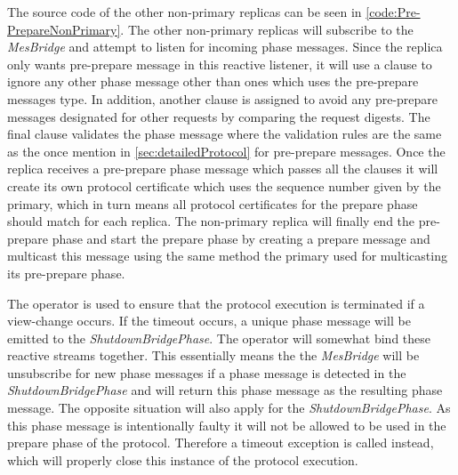 The source code of the other non-primary replicas can be seen in \autoref{code:Pre-PrepareNonPrimary}. The other non-primary replicas will subscribe to the  \emph{MesBridge} and attempt to listen for incoming phase messages. Since the replica only wants pre-prepare message in this reactive listener, it will use a  clause to ignore any other phase message other than ones which uses the pre-prepare messages type. In addition, another  clause is assigned to avoid any pre-prepare messages designated for other requests by comparing the request digests. The final  clause validates the phase message where the validation  rules are the same as the once mention in \autoref{sec:detailedProtocol} for pre-prepare messages. Once the replica receives a pre-prepare phase message which passes all the  clauses it will create its own protocol certificate which uses the sequence number given by the primary, which in turn means all protocol certificates for the prepare phase should match for each replica. The non-primary replica will finally end the pre-prepare phase and start the prepare phase by creating a prepare message and multicast this message using the same method the primary used for multicasting its pre-prepare phase. 

The  operator is used to ensure that the protocol execution is terminated if a view-change occurs. If the timeout occurs, a unique phase message will be emitted to the  \emph{ShutdownBridgePhase}. The  operator will somewhat bind these reactive streams together. This essentially means the the \emph{MesBridge} will be unsubscribe for new phase messages if a phase message is detected in the \emph{ShutdownBridgePhase} and will return this phase message as the resulting phase message. The opposite situation will also apply for the \emph{ShutdownBridgePhase}. As this phase message is intentionally faulty it will not be allowed to be used in the prepare phase of the protocol. Therefore a timeout exception is called instead, which will properly close this instance of the protocol execution.

